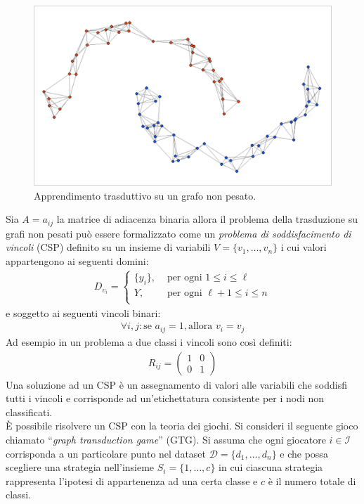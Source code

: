 	\begin{figure}[h!]
	    \centering
	    \includegraphics[width=12cm]{images/transduction}
		\caption{Apprendimento trasduttivo su un grafo non pesato.}
	\end{figure}
	
	\newpage
	
	Sia $A = a_{ij}$ la matrice di adiacenza binaria allora il problema della trasduzione su grafi non pesati può essere formalizzato come un \emph{problema di soddisfacimento di vincoli} (CSP) definito su un insieme di variabili $V = \{v_1, \dots, v_n\}$ i cui valori appartengono ai seguenti domini:
	\begin{align*}
		D_{v_i} =
		\begin{cases}
			\{y_i\}, &\text{ per ogni }1 \leq i \leq \ell\\
			Y, &\text{ per ogni }\ell + 1 \leq i \leq n\\
		\end{cases}
	\end{align*}
	e soggetto ai seguenti vincoli binari:
	\begin{align*}
		\forall i, j: \text{se } a_{ij} = 1, \text{allora } v_i = v_j
	\end{align*}
	Ad esempio in un problema a due classi i vincoli sono così definiti:
	\begin{align*}
		R_{ij} = 
		\begin{pmatrix}
			1 & 0 \\
			0 & 1
		\end{pmatrix}
	\end{align*}
	Una soluzione ad un CSP è un assegnamento di valori alle variabili che soddisfi tutti i vincoli e corrisponde ad un'etichettatura consistente per i nodi non classificati.\\
	
	È possibile risolvere un CSP con la teoria dei giochi. Si consideri il seguente gioco chiamato “\emph{graph transduction game}” (GTG). Si assuma che ogni giocatore $i \in \mathcal{I}$ corrisponda a un particolare punto nel dataset $\mathcal{D} = \{d_1, \dots, d_n \}$ e che possa scegliere una strategia nell'insieme $S_i = \{ 1, \dots, c\}$ in cui ciascuna strategia rappresenta l'ipotesi di appartenenza ad una certa classe e $c$ è il numero totale di classi.\\
	
